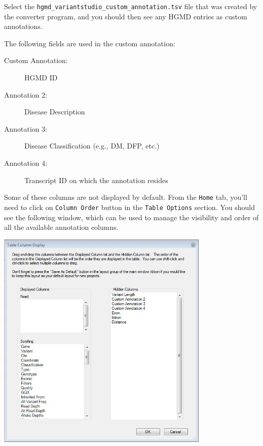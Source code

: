 \documentclass[11pt,titlepage,a4paper]{article}
\begin{document}
Select the \texttt{hgmd\_variantstudio\_custom\_annotation.tsv} file that was created by the converter program, and you should then see any HGMD entries as custom annotations.

The following fields are used in the custom annotation:

\begin{description}
\item[Custom Annotation:] HGMD ID
\item[Annotation 2:] Disease Description
\item[Annotation 3:] Disease Classification (e.g., DM, DFP, etc.)
\item[Annotation 4:] Transcript ID on which the annotation resides 
\end{description}

Some of these columns are not displayed by default. From the \texttt{Home} tab, you'll need to click on \texttt{Column Order} button in the \texttt{Table Options} section. You should see the following window, which can be used to manage the visibility and order of all the available annotation columns.

\begin{center}
\includegraphics[width=4in]{vscolumnorder.JPG}
\end{center}
\end{document}
